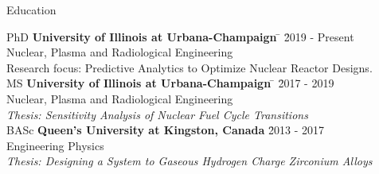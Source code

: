 \documentclass{resume2} %
\begin{document}
\centering
\iffalse
I am an engineer that is passionate about \\ 
nuclear technology and developing innovative \\
systems to face today's energy challenges.   

Gwen is passionate about nuclear power and developing \\
innovative systems to improve nuclear energy and fuel cycle\\
technologies. She wants to contribute to pressing global\\
energy challenges and environmental sustainability. 
\fi

\raggedright

\begin{rSection}{Education}
	
\begin{tabbing}
PhD \hspace*{1.5 em}\= \textbf{University of Illinois at Urbana-Champaign} \hspace*{5em} \= \hspace*{7.7em} \= 2019 - Present \\
\> Nuclear, Plasma and Radiological Engineering \\
\> Research focus: Predictive Analytics to Optimize Nuclear Reactor Designs. \\
%	
MS \hspace*{2 em}\= \textbf{University of Illinois at Urbana-Champaign} \hspace*{5em} \= \hspace*{9em} \= 2017 - 2019 \\
\> Nuclear, Plasma and Radiological Engineering \\
\> \textit{Thesis: Sensitivity Analysis of Nuclear Fuel Cycle Transitions}\\
%
BASc \hspace*{2 em}\> \textbf{Queen's University at Kingston, Canada} \> \hspace*{9em} \= 2013 - 2017 \\
\> Engineering Physics \\
\> \textit{Thesis: Designing a System to Gaseous Hydrogen Charge Zirconium Alloys }
\end{tabbing}

\end{rSection}
\end{document}
